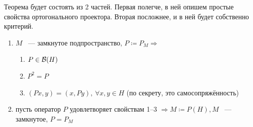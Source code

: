 \documentclass[document]{subfiles}
\begin{document}
\begin{theorem}
    Теорема будет состоять из 2 частей. Первая полегче, в ней опишем простые свойства ортогонального проектора. Вторая посложнее, и в ней будет собственно критерий.
    \begin{enumerate}
        \item $M$ ~--- замкнутое подпространство, $P \coloneqq P_M \Rightarrow$ 
        \begin{enumerate}
            \item $P \in \mathcal{B}(H)$
            \item $P^2 = P$
            \item $(Px,y) = (x,Py), \: \forall x,y \in  H$ (по секрету, это самосопряжённость) 
        \end{enumerate}
        \item пусть оператор $P$ удовлетворяет свойствам 1--3 $\Rightarrow M \coloneqq P(H), M$ ~--- замкнутое, $P = P_M$
    \end{enumerate}
\end{theorem}
\end{document}
